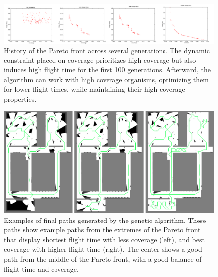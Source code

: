 \documentclass[letterpaper, 10 pt, conference]{ieeeconf}  %
\begin{document}
\begin{figure}
\centering
\includegraphics[width=1.0\linewidth]{figures/pareto_history2.png}
\caption{History of the Pareto front across several generations. The dynamic constraint placed on coverage prioritizes high coverage but also induces high flight time for the first 100 generations. Afterward, the algorithm can work with high coverage organisms, optimizing them for lower flight times, while maintaining their high coverage properties.}
\label{fig:pareto_cheetos}
\end{figure}

\begin{figure}
\centering
\includegraphics[width=1.0\linewidth]{figures/final_paths.png}
\caption{Examples of final paths generated by the genetic algorithm. These paths show example paths from the extremes of the Pareto front that display shortest flight time with less coverage (left), and best coverage with higher flight time (right). The center shows a good path from the middle of the Pareto front, with a good balance of flight time and coverage.}
\label{fig:final_paths}

\end{figure}
\end{document}
